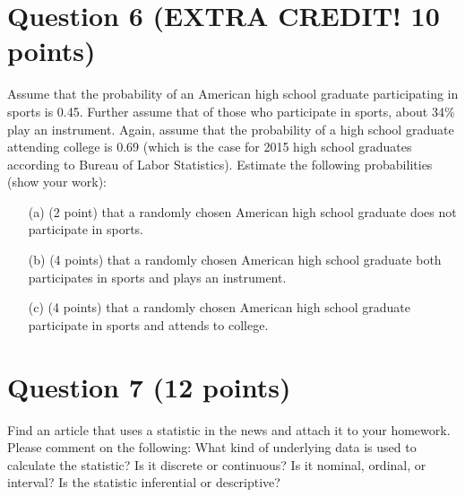 \documentclass[12pt,letterpaper]{article}
\begin{document}
	\section*{Question 6 (EXTRA CREDIT! 10 points)}
	Assume that the probability of an American high school graduate participating in sports is 0.45. Further assume that of those who participate in sports, about 34\% play an instrument. Again, assume that the probability of a high school graduate attending college is 0.69 (which is the case for 2015 high school graduates according to Bureau of Labor Statistics). Estimate the following probabilities (show your work):
	
	\begin{itemize}
		\item[(a)] (2 point) that a randomly chosen American high school graduate does not participate in sports.
		\item[(b)] (4 points) that a randomly chosen American high school graduate both participates in sports and plays an instrument.
		\item[(c)] (4 points) that a randomly chosen American high school graduate participate in sports and attends to college.
	\end{itemize}
	
	\section*{Question 7 (12 points)}
	Find an article that uses a statistic in the news and attach it to your homework. Please comment on the following: What kind of underlying data is used to calculate the statistic? Is it discrete or continuous? Is it nominal, ordinal, or interval? Is the statistic inferential or descriptive?
	
\end{document}
